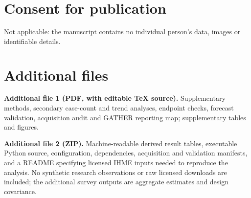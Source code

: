 \documentclass[11pt,a4paper]{article}
\begin{document}
\section*{Consent for publication}
Not applicable: the manuscript contains no individual person's data, images or identifiable details.

\section*{Additional files}
\textbf{Additional file 1 (PDF, with editable TeX source).} Supplementary methods, secondary case-count and trend analyses, endpoint checks, forecast validation, acquisition audit and GATHER reporting map; supplementary tables and figures.

\textbf{Additional file 2 (ZIP).} Machine-readable derived result tables, executable Python source, configuration, dependencies, acquisition and validation manifests, and a README specifying licensed IHME inputs needed to reproduce the analysis. No synthetic research observations or raw licensed downloads are included; the additional survey outputs are aggregate estimates and design covariance.
\end{document}
